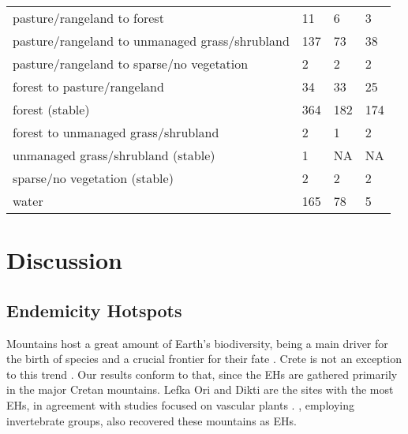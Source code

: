 \begin{table}[]
{\begin{tabular}{llll}
pasture/rangeland to forest                    & 11          & 6                & 3         \\
pasture/rangeland to unmanaged grass/shrubland & 137         & 73               & 38        \\
pasture/rangeland to sparse/no vegetation      & 2           & 2                & 2         \\
forest to pasture/rangeland                    & 34          & 33               & 25        \\
forest (stable)                                & 364         & 182              & 174       \\
forest to unmanaged grass/shrubland            & 2           & 1                & 2         \\
unmanaged grass/shrubland (stable)             & 1           & NA               & NA        \\
sparse/no vegetation (stable)                  & 2           & 2                & 2         \\
water                                          & 165         & 78               & 5         
\end{tabular}%
}
\label{table:arthropods-tableS4}
\end{table}


\section{Discussion}
\label{sec:arthropods-discussion}

    \subsection{Endemicity Hotspots}
    \label{subsec:arthropods-Endemicity-Hotspots}

Mountains host a great amount of Earth’s biodiversity, being a main driver for
the birth of species \parencite{antonelli2018geological,noroozi2018hotspots,rahbek2019building,Rahbek2019}
and a crucial frontier for their fate \parencite{steinbauer2018accelerated,urban2018escalator}.
Crete is not an exception to this trend \parencite{kougioumoutzis2020plant,trigas2013elevational}.
Our results conform to that, since the EHs are gathered primarily in the major
Cretan mountains. Lefka Ori and Dikti are the sites with the most
EHs, in agreement with studies focused on vascular plants \parencite{dimitrakopoulos2004questioning,kougioumoutzis2020plant}.
\textcite{sfenthourakis2001hotspots}, employing invertebrate groups, also recovered these mountains as EHs.

